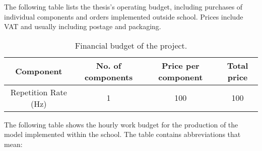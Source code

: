 The following table lists the thesis's operating budget, including purchases of individual components and orders implemented outside school. Prices include VAT and usually including postage and packaging.

\begin{table}[h!]


        \begin{tabular}{|c | c | c | c |} 
        \hline
            \textbf{Component} & \textbf{No. of components} & \textbf{Price per component} & \textbf{Total price}\\ [0.25ex] 
        \hline\hline
        Repetition Rate (Hz) & 1 & 100 & 100  \\ 
        \hline

        \hline
        \end{tabular}

    
        \caption{Financial budget of the project.}
        \label{litro}

\end{table}

The following table shows the hourly work budget for the production of the model implemented within the school. The table contains abbreviations that mean: